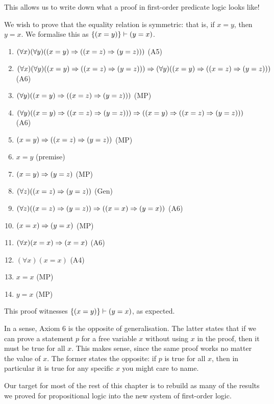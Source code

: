 \documentclass{article}
\begin{document}
This allows us to write down what a proof in first-order predicate logic looks like!

\begin{example}
    We wish to prove that the equality relation is symmetric: that is, if $x = y$, then $y = x$. We formalise this as $\left\lbrace (x = y) \right\rbrace \vdash (y = x)$.
    \begin{enumerate}
	    \item $(\forall x)(\forall y)((x=y) \Rightarrow ((x=z) \Rightarrow (y=z)))$ \hfill (A5)
	    \item $(\forall x)(\forall y)((x=y) \Rightarrow ((x=z) \Rightarrow (y=z))) \Rightarrow (\forall y)((x=y) \Rightarrow ((x=z) \Rightarrow (y=z)))$ \hfill (A6)
	    \item $(\forall y)((x=y) \Rightarrow ((x=z) \Rightarrow (y=z)))$ \hfill (MP)
	    \item $(\forall y)((x=y) \Rightarrow ((x=z) \Rightarrow (y=z))) \Rightarrow ((x=y) \Rightarrow ((x=z) \Rightarrow (y=z)))$ \hfill (A6)
	    \item $(x=y) \Rightarrow ((x=z) \Rightarrow (y=z))$ \hfill (MP)
	    \item $x=y$ \hfill (premise)
	    \item $(x=y) \Rightarrow (y=z)$ \hfill (MP)
	    \item $(\forall z)((x=z) \Rightarrow (y=z))$ \hfill (Gen)
	    \item $(\forall z)((x=z) \Rightarrow (y=z)) \Rightarrow ((x=x) \Rightarrow (y=x))$ \hfill (A6)
	    \item $(x=x) \Rightarrow (y=x)$ \hfill (MP)
	    \item $(\forall x)(x = x) \Rightarrow (x = x)$ \hfill (A6)
	    \item $(\forall x)(x = x)$ \hfill (A4)
	    \item $x = x$ \hfill (MP)
	    \item $y = x$ \hfill (MP)
	\end{enumerate}
	This proof witnesses $\left\lbrace (x = y) \right\rbrace \vdash (y = x)$, as expected.
\end{example}

\begin{note}
	In a sense, Axiom 6 is the opposite of generalisation. The latter states that if we can prove a statement $p$ for a free variable $x$ without using $x$ in the proof, then it must be true for all $x$. This makes sense, since the same proof works no matter the value of $x$. The former states the opposite: if $p$ is true for all $x$, then in particular it is true for any specific $x$ you might care to name.
\end{note}

Our target for most of the rest of this chapter is to rebuild as many of the results we proved for propositional logic into the new system of first-order logic. 
\end{document}
